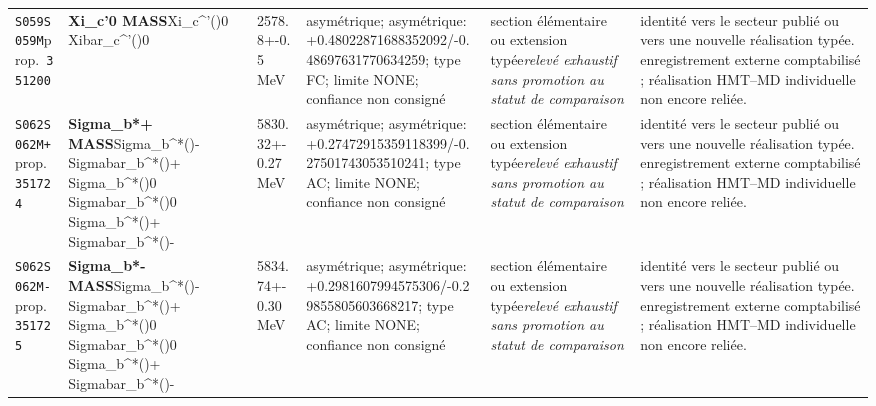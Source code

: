 \begin{landscape}
\begin{longtable}{L{1.85cm}L{4.45cm}L{2.35cm}L{4.05cm}L{3.35cm}L{7.15cm}}
\texttt{S059}\newline \texttt{S059M}\newline prop.\ \texttt{351200} & \textbf{Xi\_\allowbreak{}c'0 MASS}\newline Xi\_\allowbreak{}c\textasciicircum{}'()0 \textbar{}\allowbreak{} Xibar\_\allowbreak{}c\textasciicircum{}'()0 & 2578.8+-0.5\,MeV & asymétrique; asymétrique: +0.48022871688352092/-0.48697631770634259; type FC; limite NONE; confiance non consigné & section élémentaire ou extension typée\newline \emph{relevé exhaustif sans promotion au statut de comparaison} & identité vers le secteur publié ou vers une nouvelle réalisation typée. enregistrement externe comptabilisé ; réalisation HMT--MD individuelle non encore reliée. \\
\texttt{S062}\newline \texttt{S062M+}\newline prop.\ \texttt{351724} & \textbf{Sigma\_\allowbreak{}b*+ MASS}\newline Sigma\_\allowbreak{}b\textasciicircum{}*()- \textbar{}\allowbreak{} Sigmabar\_\allowbreak{}b\textasciicircum{}*()+ \textbar{}\allowbreak{} Sigma\_\allowbreak{}b\textasciicircum{}*()0 \textbar{}\allowbreak{} Sigmabar\_\allowbreak{}b\textasciicircum{}*()0 \textbar{}\allowbreak{} Sigma\_\allowbreak{}b\textasciicircum{}*()+ \textbar{}\allowbreak{} Sigmabar\_\allowbreak{}b\textasciicircum{}*()- & 5830.32+-0.27\,MeV & asymétrique; asymétrique: +0.27472915359118399/-0.27501743053510241; type AC; limite NONE; confiance non consigné & section élémentaire ou extension typée\newline \emph{relevé exhaustif sans promotion au statut de comparaison} & identité vers le secteur publié ou vers une nouvelle réalisation typée. enregistrement externe comptabilisé ; réalisation HMT--MD individuelle non encore reliée. \\
\texttt{S062}\newline \texttt{S062M-}\newline prop.\ \texttt{351725} & \textbf{Sigma\_\allowbreak{}b*- MASS}\newline Sigma\_\allowbreak{}b\textasciicircum{}*()- \textbar{}\allowbreak{} Sigmabar\_\allowbreak{}b\textasciicircum{}*()+ \textbar{}\allowbreak{} Sigma\_\allowbreak{}b\textasciicircum{}*()0 \textbar{}\allowbreak{} Sigmabar\_\allowbreak{}b\textasciicircum{}*()0 \textbar{}\allowbreak{} Sigma\_\allowbreak{}b\textasciicircum{}*()+ \textbar{}\allowbreak{} Sigmabar\_\allowbreak{}b\textasciicircum{}*()- & 5834.74+-0.30\,MeV & asymétrique; asymétrique: +0.2981607994575306/-0.29855805603668217; type AC; limite NONE; confiance non consigné & section élémentaire ou extension typée\newline \emph{relevé exhaustif sans promotion au statut de comparaison} & identité vers le secteur publié ou vers une nouvelle réalisation typée. enregistrement externe comptabilisé ; réalisation HMT--MD individuelle non encore reliée. \\

\end{longtable}
\end{landscape}
